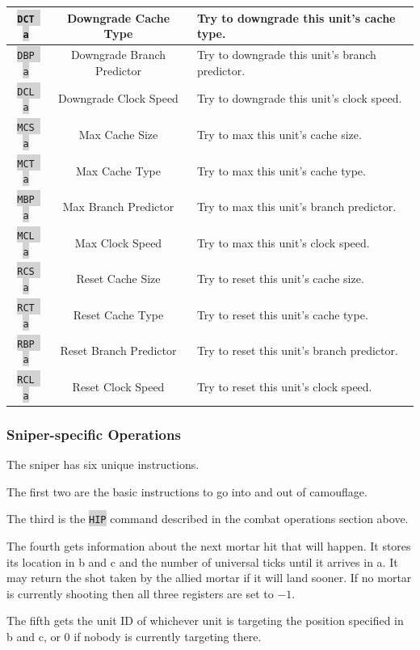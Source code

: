 \documentclass{article}
\newcommand{\vnscode}[1]{\colorbox{lightgray}{\lstinline[language=vns]{#1}}}
\begin{document}
\begin{minipage}{\textwidth}
\begin{tabular}{|c|c|l|}
    \vnscode{DCT a} & Downgrade Cache Type & Try to downgrade this unit's cache type. \\ \hline
    \vnscode{DBP a} & Downgrade Branch Predictor & Try to downgrade this unit's branch predictor. \\ \hline
    \vnscode{DCL a} & Downgrade Clock Speed & Try to downgrade this unit's clock speed. \\ \hline
    \vnscode{MCS a} & Max Cache Size & Try to max this unit's cache size. \\ \hline
    \vnscode{MCT a} & Max Cache Type & Try to max this unit's cache type. \\ \hline
    \vnscode{MBP a} & Max Branch Predictor & Try to max this unit's branch predictor. \\ \hline
    \vnscode{MCL a} & Max Clock Speed & Try to max this unit's clock speed. \\ \hline
    \vnscode{RCS a} & Reset Cache Size & Try to reset this unit's cache size. \\ \hline
    \vnscode{RCT a} & Reset Cache Type & Try to reset this unit's cache type. \\ \hline
    \vnscode{RBP a} & Reset Branch Predictor & Try to reset this unit's branch predictor. \\ \hline
    \vnscode{RCL a} & Reset Clock Speed & Try to reset this unit's clock speed. \\ \hline
\end{tabular}
\end{minipage}

\subsubsection{Sniper-specific Operations}

The sniper has six unique instructions.

The first two are the basic instructions to go into and out of camouflage.

The third is the \vnscode{HIP} command described in the combat operations
section above.

The fourth gets information about the next mortar hit that will happen. It
stores its location in b and c and the number of universal ticks until it
arrives in a. It may return the shot taken by the allied mortar if it will land
sooner. If no mortar is currently shooting then all three registers are set to
$-1$.

The fifth gets the unit ID of whichever unit is targeting the position specified
in b and c, or 0 if nobody is currently targeting there.
\end{document}
